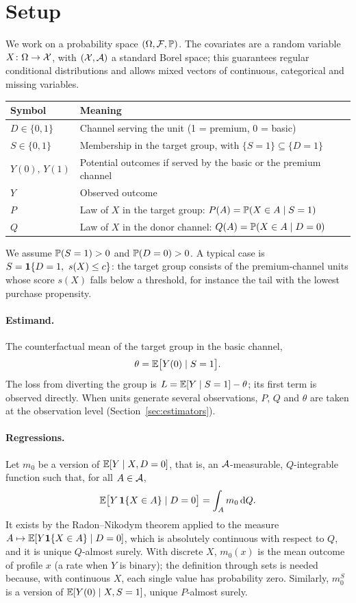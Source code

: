\section{Setup}\label{sec:setup}

We work on a probability space $(\Omega,\mathcal F,\mathbb{P})$. The covariates are a random variable $X\colon\Omega\to\mathcal{X}$, with $(\mathcal{X},\mathcal{A})$ a standard Borel space; this guarantees regular conditional distributions and allows mixed vectors of continuous, categorical and missing variables.

\begin{center}
\begin{tabular}{@{}ll@{}}
\toprule
Symbol & Meaning \\
\midrule
$D\in\{0,1\}$ & Channel serving the unit (1 = premium, 0 = basic) \\
$S\in\{0,1\}$ & Membership in the target group, with $\{S=1\}\subseteq\{D=1\}$ \\
$Y(0),\,Y(1)$ & Potential outcomes if served by the basic or the premium channel \\
$Y$ & Observed outcome \\
$P$ & Law of $X$ in the target group: $P(A)=\mathbb{P}(X\in A\mid S=1)$ \\
$Q$ & Law of $X$ in the donor channel: $Q(A)=\mathbb{P}(X\in A\mid D=0)$ \\
\bottomrule
\end{tabular}
\end{center}

We assume $\mathbb{P}(S=1)>0$ and $\mathbb{P}(D=0)>0$. A typical case is $S=\mathbf{1}\{D=1,\ s(X)\le c\}$: the target group consists of the premium-channel units whose score $s(X)$ falls below a threshold, for instance the tail with the lowest purchase propensity.

\paragraph{Estimand.} The counterfactual mean of the target group in the basic channel,
\[
\theta=\mathbb{E}\bigl[Y(0)\mid S=1\bigr].
\]
The loss from diverting the group is $L=\mathbb{E}[Y\mid S=1]-\theta$; its first term is observed directly. When units generate several observations, $P$, $Q$ and $\theta$ are taken at the observation level (Section~\ref{sec:estimators}).

\paragraph{Regressions.} Let $m_0$ be a version of $\mathbb{E}[Y\mid X,D=0]$, that is, an $\mathcal{A}$-measurable, $Q$-integrable function such that, for all $A\in\mathcal{A}$,
\[
\mathbb{E}\bigl[Y\,\mathbf{1}\{X\in A\}\mid D=0\bigr]=\int_A m_0\,\mathrm{d} Q .
\]
It exists by the Radon--Nikodym theorem applied to the measure $A\mapsto\mathbb{E}[Y\mathbf{1}\{X\in A\}\mid D=0]$, which is absolutely continuous with respect to $Q$, and it is unique $Q$-almost surely. With discrete $X$, $m_0(x)$ is the mean outcome of profile $x$ (a rate when $Y$ is binary); the definition through sets is needed because, with continuous $X$, each single value has probability zero. Similarly, $m_0^S$ is a version of $\mathbb{E}[Y(0)\mid X,S=1]$, unique $P$-almost surely.

